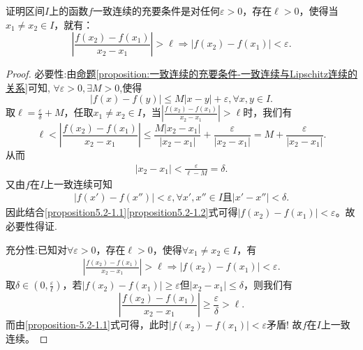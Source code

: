 \documentclass[../../main.tex]{subfiles}%
\begin{document}
\begin{proposition}\label{proposition:一致连续的充要条件-分式形式}
证明区间\(I\)上的函数\(f\)一致连续的充要条件是对任何\(\varepsilon > 0\)，存在\(\ell > 0\)，使得当\(x_1\neq x_2\in I\)，就有：
\[
\left|\frac{f(x_2)-f(x_1)}{x_2 - x_1}\right|>\ell\Rightarrow|f(x_2)-f(x_1)|<\varepsilon.
\]
\end{proposition}
\begin{proof}

{\heiti 必要性:}由\hyperref[proposition:一致连续的充要条件-一致连续与Lipschitz连续的关系]{命题\ref{proposition:一致连续的充要条件-一致连续与Lipschitz连续的关系}}可知,
$\forall \varepsilon>0,\exists M > 0$,使得
\[
|f(x)-f(y)|\leqslant  M|x - y|+\varepsilon,\forall x,y\in I.
\]
取\(\ell=\frac{\varepsilon}{\delta}+M\)，任取\(x_1\neq x_2\in I\)，当\(\left|\frac{f(x_2)-f(x_1)}{x_2 - x_1}\right|>\ell\)时，我们有
\[
\ell<\left|\frac{f(x_2)-f(x_1)}{x_2 - x_1}\right|\leqslant \frac{M|x_2 - x_1|}{|x_2 - x_1|}+\frac{\varepsilon}{|x_2 - x_1|}=M+\frac{\varepsilon}{|x_2 - x_1|}.
\]
从而
\begin{align}
|x_2 - x_1|<\frac{\varepsilon}{\ell - M}=\delta.  \label{proposition5.2-1.1}
\end{align}
又由\(f\)在\(I\)上一致连续可知
\begin{align}
|f(x') - f(x'')|<\varepsilon,\forall x',x''\in I\text{且}|x' - x''|<\delta. \label{proposition5.2-1.2} 
\end{align}
因此结合\eqref{proposition5.2-1.1}\eqref{proposition5.2-1.2}式可得\(|f(x_2)-f(x_1)|<\varepsilon\)。故必要性得证.

{\heiti 充分性:}已知对\(\forall \varepsilon >0\)，存在\(\ell >0\)，使得\(\forall x_1\neq x_2\in I\)，有
\begin{align}
\left|\frac{f(x_2) - f(x_1)}{x_2 - x_1}\right|>\ell\Rightarrow|f(x_2) - f(x_1)|<\varepsilon. \label{proposition-5.2-1.1}
\end{align}
取\(\delta \in \left(0,\frac{\varepsilon}{\ell}\right)\)，若\(|f(x_2) - f(x_1)|\geqslant \varepsilon\)但\(|x_2 - x_1|\leqslant \delta\)，则我们有
\[
\left|\frac{f(x_2) - f(x_1)}{x_2 - x_1}\right|\geqslant \frac{\varepsilon}{\delta}>\ell.
\]
而由\eqref{proposition-5.2-1.1}式可得，此时\(|f(x_2) - f(x_1)|<\varepsilon\)矛盾! 故\(f\)在\(I\)上一致连续。 

\end{proof}
\end{document}
